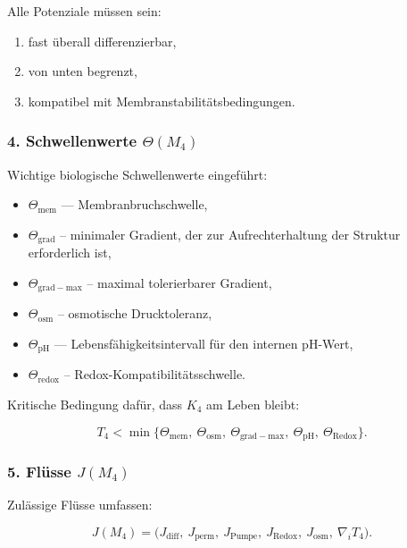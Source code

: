 Alle Potenziale müssen sein:

\begin{enumerate}
    \item fast überall differenzierbar,
    \item von unten begrenzt,
    \item kompatibel mit Membranstabilitätsbedingungen.
\end{enumerate}

\subsubsection*{4. Schwellenwerte \texorpdfstring{$\Theta(M_4)$}{\Theta(M_4)}}

Wichtige biologische Schwellenwerte eingeführt:

\begin{itemize}
    \item $\Theta_{\mathrm{mem}}$ — Membranbruchschwelle,
    \item $\Theta_{\mathrm{grad}}$ – minimaler Gradient, der zur Aufrechterhaltung der Struktur erforderlich ist,
    \item $\Theta_{\mathrm{grad-max}}$ – maximal tolerierbarer Gradient,
    \item $\Theta_{\mathrm{osm}}$ – osmotische Drucktoleranz,
    \item $\Theta_{\mathrm{pH}}$ — Lebensfähigkeitsintervall für den internen pH-Wert,
    \item $\Theta_{\mathrm{redox}}$ – Redox-Kompatibilitätsschwelle.
\end{itemize}

Kritische Bedingung dafür, dass $K_4$ am Leben bleibt:

\[
T_4 <
\min\{
\Theta_{\mathrm{mem}},\
\Theta_{\mathrm{osm}},\
\Theta_{\mathrm{grad-max}},\
\Theta_{\mathrm{pH}},\
\Theta_{\mathrm{Redox}}
\}.
\]

\subsubsection*{5. Flüsse \texorpdfstring{$J(M_4)$}{J(M_4)}}

Zulässige Flüsse umfassen:

\[
J(M_4)
=
\big(
J_{\mathrm{diff}},\
J_{\mathrm{perm}},\
J_{\mathrm{Pumpe}},\
J_{\mathrm{Redox}},\
J_{\mathrm{osm}},\
\nabla_i T_4
\Big).
\]

